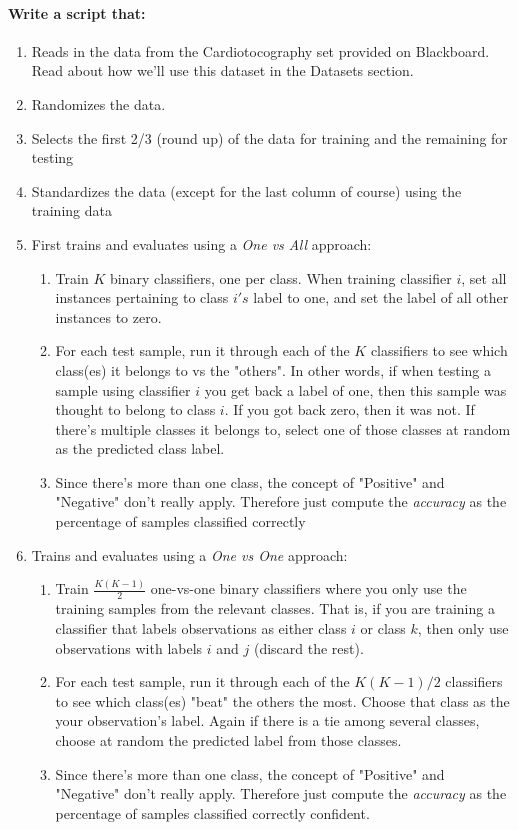 \documentclass[12pt]{article}
\begin{document}
\paragraph{Write a script that:}
\begin{enumerate}
\item Reads in the data from the Cardiotocography set provided on Blackboard.  Read about how we'll use this dataset in the Datasets section.
\item Randomizes the data.
\item Selects the first 2/3 (round up) of the data for training and the remaining for testing
\item Standardizes the data (except for the last column of course) using the training data
\item First trains and evaluates using a \emph{One vs All} approach:
\begin{enumerate}
\item Train $K$ binary classifiers, one per class.  When training classifier $i$, set all instances pertaining to class $i's$ label to one, and set the label of all other instances to zero.        \item For each test sample, run it through each of the $K$ classifiers to see which class(es) it belongs to vs the "others".  In other words, if when testing a sample using classifier $i$ you get back a label of one, then this sample was thought to belong to class $i$.  If you got back zero, then it was not.  If there's multiple classes it belongs to, select one of those classes at random as the predicted class label.
\item Since there's more than one class, the concept of "Positive" and "Negative" don't really apply.  Therefore just compute the \emph{accuracy} as the percentage of samples classified correctly 
\end{enumerate}
\item Trains and evaluates using a \emph{One vs One} approach:
\begin{enumerate}
\item Train $\frac{K(K-1)}{2}$ one-vs-one binary classifiers where you only use the training samples from the relevant classes.  That is, if you are training a classifier that labels observations as either class $i$ or class $k$, then only use observations with labels $i$ and $j$ (discard the rest).
\item For each test sample, run it through each of the $K(K-1)/2$ classifiers to see which class(es) "beat" the others the most.  Choose that class as the your observation's label.  Again if there is a tie among several classes, choose at random the predicted label from those classes.
\item Since there's more than one class, the concept of "Positive" and "Negative" don't really apply.  Therefore just compute the \emph{accuracy} as the percentage of samples classified correctly  confident.
\end{enumerate}
\end{enumerate}
\end{document}
